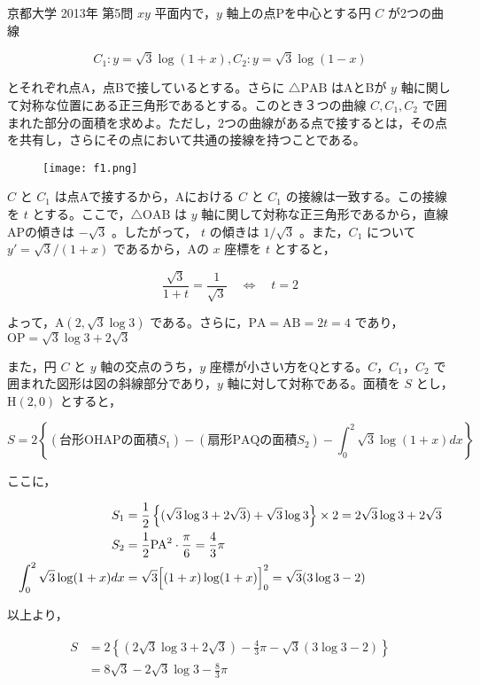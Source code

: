 \documentclass[a4paper]{ltjsarticle}
\begin{document}
\begin{itembox}[l]{京都大学 2013年 第5問}
    $xy$ 平面内で，$y$ 軸上の点Pを中心とする円 $C$ が2つの曲線

    \begin{equation*}
        C_1\colon y=\sqrt{3}\log (1+x), C_2\colon y=\sqrt{3}\log (1-x)
    \end{equation*}

    とそれぞれ点A，点Bで接しているとする。さらに $\triangle\mathrm{PAB}$ はAとBが $y$ 軸に関して対称な位置にある正三角形であるとする。このとき３つの曲線 $C, C_1, C_2$ で囲まれた部分の面積を求めよ。ただし，2つの曲線がある点で接するとは，その点を共有し，さらにその点において共通の接線を持つことである。
\end{itembox}

\begin{figure}[!ht]
    \centering
    \texttt{[image: f1.png]}
\end{figure}

$C$ と $C_1$ は点Aで接するから，Aにおける $C$ と $C_1$ の接線は一致する。この接線を $t$ とする。ここで，$\triangle\mathrm{OAB}$ は $y$ 軸に関して対称な正三角形であるから，直線APの傾きは $-\sqrt{3}$ 。したがって， $t$ の傾きは $1/\sqrt{3}$ 。また，$C_1$ について $y'=\sqrt{3}/(1+x)$ であるから，Aの $x$ 座標を $t$ とすると，

\begin{equation*}
    \frac{\sqrt{3}}{1+t}=\frac{1}{\sqrt{3}}\quad\Longleftrightarrow\quad t=2
\end{equation*}

よって，$\mathrm{A}(2, \sqrt{3}\log 3)$ である。さらに，$\mathrm{PA}=\mathrm{AB}=2t=4$ であり，$\mathrm{OP}=\sqrt{3}\log 3+2\sqrt{3}$

また，円 $C$ と $y$ 軸の交点のうち，$y$ 座標が小さい方をQとする。$C$，$C_1$，$C_2$ で囲まれた図形は図の斜線部分であり，$y$ 軸に対して対称である。面積を $S$ とし，$\mathrm{H}(2, 0)$ とすると，

\begin{equation*}
    S=2\left\{(\text{台形OHAPの面積}S_1)-(\text{扇形PAQの面積}S_2)-\int_0^2\sqrt{3}\log(1+x)dx\right\}
\end{equation*}

ここに，

\begin{align*}
    S_1                         & =\frac{1}{2}\left\{(\sqrt{3}\log 3+2\sqrt{3})+\sqrt{3}\log 3\right\}\times 2=2\sqrt{3}\log 3+2\sqrt{3} \\
    S_2                         & =\frac{1}{2}\mathrm{PA}^2\cdot\frac{\pi}{6}=\frac{4}{3}\pi                                             \\
    \int_0^2\sqrt{3}\log(1+x)dx & =\sqrt{3}\Bigl[(1+x)\log(1+x)\Bigr]_0^2=\sqrt{3}(3\log 3-2)
\end{align*}

以上より，

\begin{align*}
    S & =2\left\{(2\sqrt{3}\log 3+2\sqrt{3})-\frac{4}{3}\pi-\sqrt{3}(3\log 3-2)\right\} \\
      & =8\sqrt{3}-2\sqrt{3}\log 3-\frac{8}{3}\pi
\end{align*}
\end{document}
